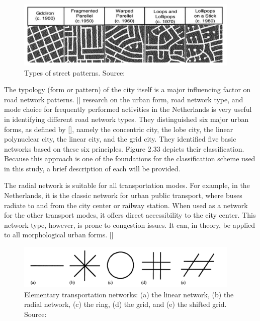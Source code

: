 \begin{figure}[h]
\centering
\includegraphics[width=0.95\textwidth,center]{picture/figure2.png}
\caption[Types of Street Patterns]{Types of street patterns. Source: \cite{Southworth:2003}}
\label{fig:streetpatterns}
\end{figure}

The typology (form or pattern) of the city itself is a major influencing factor on road network patterns. [\cite{Snellen:2002}] research on the urban form, road network type, and mode choice for frequently performed activities in the Netherlands is very useful in identifying different road network types. They distinguished six major urban forms, as defined by [\cite{deKlerk:1980, Rottier:1980}], namely the concentric city, the lobe city, the linear polynuclear city, the linear city, and the grid city. They identified five basic networks based on these six principles. Figure 2.33 depicts their classification. Because this approach is one of the foundations for the classification scheme used in this study, a brief description of each will be provided.

The radial network is suitable for all transportation modes. For example, in the Netherlands, it is the classic network for urban public transport, where buses radiate to and from the city center or railway station. When used as a network for the other transport modes, it offers direct accessibility to the city center. This network type, however, is prone to congestion issues. It can, in theory, be applied to all morphological urban forms. [\cite{Snellen:2002}]

\begin{figure}[h]
\centering
\includegraphics[width=0.95\textwidth,center]{picture/figure3.png}
\caption[Elementary Transportation Networks]{Elementary transportation networks: (a) the linear network, (b) the radial network, (c) the ring, (d) the grid, and (e) the shifted grid. Source: \cite{Snellen:2002}}
\label{fig:transportnetworks}
\end{figure}

